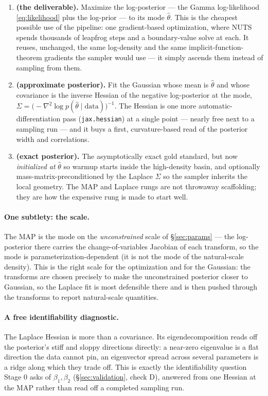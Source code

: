 \documentclass[11pt]{article}
\begin{document}
\begin{enumerate}
\item[\textbf{MAP}] \textbf{(the deliverable).} Maximize the log-posterior --- the Gamma log-likelihood \eqref{eq:likelihood} plus the log-prior --- to its mode $\hat\theta$. This is the cheapest possible use of the pipeline: one gradient-based optimization, where NUTS spends thousands of leapfrog steps and a boundary-value solve at each. It reuses, unchanged, the same log-density and the same implicit-function-theorem gradients the sampler would use --- it simply ascends them instead of sampling from them.

\item[\textbf{Laplace}] \textbf{(approximate posterior).} Fit the Gaussian whose mean is $\hat\theta$ and whose covariance is the inverse Hessian of the negative log-posterior at the mode, $\Sigma = \bigl(-\nabla^2 \log p(\hat\theta \mid \text{data})\bigr)^{-1}$. The Hessian is one more automatic-differentiation pass (\texttt{jax.hessian}) at a single point --- nearly free next to a sampling run --- and it buys a first, curvature-based read of the posterior width and correlations.

\item[\textbf{NUTS}] \textbf{(exact posterior).} The asymptotically exact gold standard, but now \emph{initialized at} $\hat\theta$ so warmup starts inside the high-density basin, and optionally mass-matrix-preconditioned by the Laplace $\Sigma$ so the sampler inherits the local geometry. The MAP and Laplace rungs are not throwaway scaffolding; they are how the expensive rung is made to start well.
\end{enumerate}

\paragraph{One subtlety: the scale.} The MAP is the mode on the \emph{unconstrained} scale of \S\ref{sec:params} --- the log-posterior there carries the change-of-variables Jacobian of each transform, so the mode is parameterization-dependent (it is not the mode of the natural-scale density). This is the right scale for the optimization and for the Gaussian: the transforms are chosen precisely to make the unconstrained posterior closer to Gaussian, so the Laplace fit is most defensible there and is then pushed through the transforms to report natural-scale quantities.

\paragraph{A free identifiability diagnostic.} The Laplace Hessian is more than a covariance. Its eigendecomposition reads off the posterior's stiff and sloppy directions directly: a near-zero eigenvalue is a flat direction the data cannot pin, an eigenvector spread across several parameters is a ridge along which they trade off. This is exactly the identifiability question Stage 0 asks of $\beta_1, \beta_2$ (\S\ref{sec:validation}, check D), answered from one Hessian at the MAP rather than read off a completed sampling run.
\end{document}
